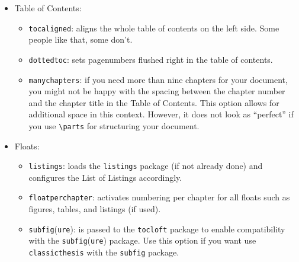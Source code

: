 \begin{itemize}
\begin{itemize}
		    \item\texttt{pdfspacing}: makes use of pdftex' letter spacing
		    capabilities via the \texttt{microtype} package.\footnote{Use 
		    \texttt{microtype}'s \texttt{DVIoutput} option to generate
		    DVI with pdftex.} This fixes some serious issues regarding 
		    math formul\ae\ etc. (\eg, ``\ss'') in headers. 
		    
		    \item\texttt{minionprospacing}: uses the internal \texttt{textssc}
		    command of the \texttt{MinionPro} package for letter spacing. This 
		    automatically enables the \texttt{minionpro} option and overrides
		    the \texttt{pdfspacing} option.
    
		\end{itemize}  

	\item Table of Contents:
		\begin{itemize}
			 \item\texttt{tocaligned}: aligns the whole table of contents on
		    the left side. Some people like that, some don't.
		    
		    \item\texttt{dottedtoc}: sets pagenumbers flushed right in the 
		    table of contents.

			\item\texttt{manychapters}: if you need more than nine chapters for 
	    your document, you might not be happy with the spacing between the 
	    chapter number and the chapter title in the Table of Contents. 
	    This option allows for additional space in this context. 
	    However, it does not look as ``perfect'' if you use
	    \verb|\parts| for structuring your document.
		    
		\end{itemize}
    
	\item Floats:
		\begin{itemize}
    \item\texttt{listings}: loads the \texttt{listings} package (if not 
    already done) and configures the List of Listings accordingly.
    
    \item\texttt{floatperchapter}: activates numbering per chapter for
    all floats such as figures, tables, and listings (if used).	
    
	    \item\texttt{subfig}(\texttt{ure}): is passed to the \texttt{tocloft} 
	    package to enable compatibility with the \texttt{subfig}(\texttt{ure}) 
	    package. Use this option if you want use \texttt{classicthesis} with the
	    \texttt{subfig} package.
    	

\end{itemize}
\end{itemize}
